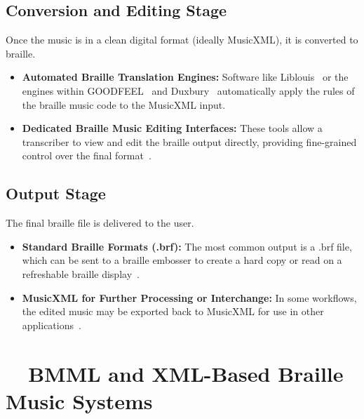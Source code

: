 \subsection{Conversion and Editing Stage}\label{ch10:ssec:conversion-editing-stage}
Once the music is in a clean digital format (ideally \gls{MusicXML}), it is converted to braille.
\begin{itemize}
	\item \textbf{Automated Braille Translation Engines:} Software like Liblouis~\supercite{LiblouisGitHub} or the engines within GOODFEEL~\supercite{dancingdots-goodfeel} and Duxbury~\supercite{DuxburyDBT} automatically apply the rules of the braille music code to the \gls{MusicXML} input.
	\item \textbf{Dedicated Braille Music Editing Interfaces:} These tools allow a transcriber to view and edit the braille output directly, providing fine-grained control over the final format~\supercite{braillemusiceditor, braillemusicnotator}.
\end{itemize}

\subsection{Output Stage}\label{ch10:ssec:output-stage}
The final braille file is delivered to the user.
\begin{itemize}
	\item \textbf{Standard Braille Formats (.brf):} The most common output is a .brf file, which can be sent to a braille embosser to create a hard copy or read on a refreshable braille display~\supercite{BRLFormat}.
	\item \textbf{MusicXML for Further Processing or Interchange:} In some workflows, the edited music may be exported back to \gls{MusicXML} for use in other applications~\supercite{daisy-musicxml}.
\end{itemize}

\section{~~BMML and XML-Based Braille Music Systems}\label{ch10:sec:bmml-xml-systems}

